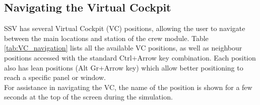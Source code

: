 \documentclass[Space_Shuttle_Vessel_Manual.tex]{subfiles}
\begin{document}
\begin{multicols*}{2}
\subsection{Navigating the Virtual Cockpit}
\label{sec:nav-vc}
SSV has several Virtual Cockpit (VC) positions, allowing the user to navigate between the main locations and station of the crew module. Table \ref{tab:VC_navigation} lists all the available VC positions, as well as neighbour positions accessed with the standard Ctrl+Arrow key combination. Each position also has lean positions (Alt Gr+Arrow key) which allow better positioning to reach a specific panel or window.\\
For assistance in navigating the VC, the name of the position is shown for a few seconds at the top of the screen during the simulation.
\\

\end{multicols*}
\end{document}
